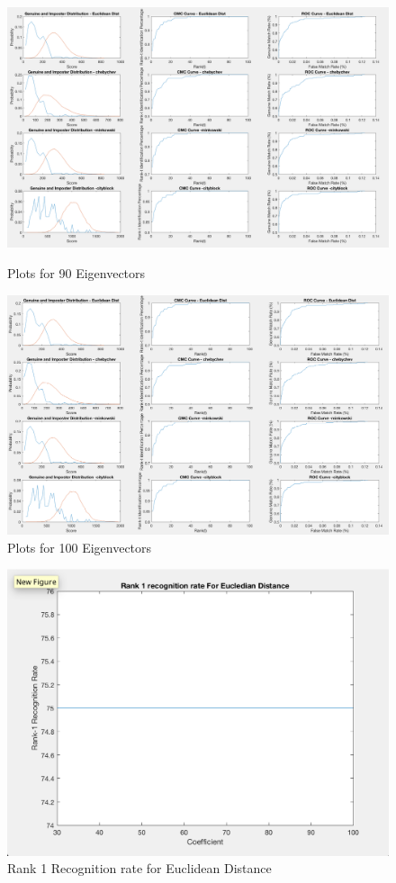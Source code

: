 \documentclass[10pt, letterpaper]{article}
\begin{document}
\begin{figure}
    \includegraphics[width=\linewidth]{images/for90coeff}
 \caption{ Plots for 90 Eigenvectors}
 \label{fig:90coeff}
 
     \includegraphics[width=\linewidth]{images/for100coeff}
 \caption{ Plots for 100 Eigenvectors}
 \label{fig:100coeff}
\end{figure}

\begin{figure}
    \includegraphics[width=\linewidth]{images/Rank1Rate_Euclidean}
 \caption{ Rank 1 Recognition rate for Euclidean Distance}
 \label{fig:Rank1Eu}
\end{figure}
\end{document}

